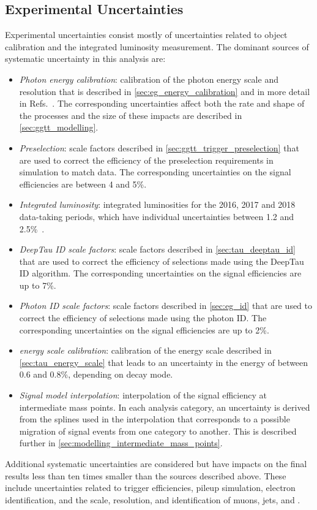 \subsection{Experimental Uncertainties}\label{sec:ggtt_experimental_uncert}

Experimental uncertainties consist mostly of uncertainties related to object calibration and the integrated luminosity measurement. The dominant sources of systematic uncertainty in this analysis are:
\begin{itemize}
    \item \textit{Photon energy calibration}: calibration of the photon energy scale and resolution that is described in \cref{sec:eg_energy_calibration} and in more detail in Refs.~\cite{CMS:2013lxn,CMS:2024ppo,CMS:2020uim}. The corresponding uncertainties affect both the rate and shape of the processes and the size of these impacts are described in \cref{sec:ggtt_modelling}.
    \item \textit{Preselection}: scale factors described in \cref{sec:ggtt_trigger_preselection} that are used to correct the efficiency of the preselection requirements in simulation to match data. The corresponding uncertainties on the signal efficiencies are between 4 and 5\%.
    \item \textit{Integrated luminosity}: integrated luminosities for the 2016, 2017 and 2018 data-taking periods, which have individual uncertainties between 1.2 and 2.5\%~\cite{CMS-PAS-LUM-17-004,CMS-PAS-LUM-18-002,CMS:2021xjt}.
    \item \textit{DeepTau ID scale factors}: scale factors described in \cref{sec:tau_deeptau_id} that are used to correct the efficiency of selections made using the DeepTau ID algorithm. The corresponding uncertainties on the signal efficiencies are up to 7\%.
    \item \textit{Photon ID scale factors}: scale factors described in \cref{sec:eg_id} that are used to correct the efficiency of selections made using the photon ID. The corresponding uncertainties on the signal efficiencies are up to 2\%.
    \item \textit{\tauh energy scale calibration}: calibration of the \tauh energy scale described in \cref{sec:tau_energy_scale} that leads to an uncertainty in the \tauh energy of between 0.6 and 0.8\%, depending on \tauh decay mode.
    \item \textit{Signal model interpolation}: interpolation of the signal efficiency at intermediate mass points. In each analysis category, an uncertainty is derived from the splines used in the interpolation that corresponds to a possible migration of signal events from one category to another. This is described further in \cref{sec:modelling_intermediate_mass_points}.
\end{itemize}
Additional systematic uncertainties are considered but have impacts on the final results less than ten times smaller than the sources described above. These include uncertainties related to trigger efficiencies, pileup simulation, electron identification, and the scale, resolution, and identification of muons, jets, and \MET.